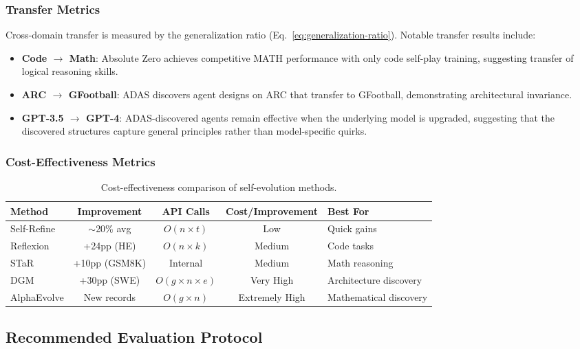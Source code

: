 \subsubsection{Transfer Metrics}

Cross-domain transfer is measured by the generalization ratio (Eq.~\ref{eq:generalization-ratio}). Notable transfer results include:

\begin{itemize}
\item \textbf{Code $\to$ Math}: Absolute Zero achieves competitive MATH performance with only code self-play training, suggesting transfer of logical reasoning skills.
\item \textbf{ARC $\to$ GFootball}: ADAS discovers agent designs on ARC that transfer to GFootball, demonstrating architectural invariance.
\item \textbf{GPT-3.5 $\to$ GPT-4}: ADAS-discovered agents remain effective when the underlying model is upgraded, suggesting that the discovered structures capture general principles rather than model-specific quirks.
\end{itemize}

\subsubsection{Cost-Effectiveness Metrics}

\begin{table}[htbp]
\centering
\caption{Cost-effectiveness comparison of self-evolution methods.}
\label{tab:cost-effectiveness}
\begin{tabular}{lcccl}
\toprule
\textbf{Method} & \textbf{Improvement} & \textbf{API Calls} & \textbf{Cost/Improvement} & \textbf{Best For} \\
\midrule
Self-Refine & $\sim$20\% avg & $O(n \times t)$ & Low & Quick gains \\
Reflexion & +24pp (HE) & $O(n \times k)$ & Medium & Code tasks \\
STaR & +10pp (GSM8K) & Internal & Medium & Math reasoning \\
DGM & +30pp (SWE) & $O(g \times n \times e)$ & Very High & Architecture discovery \\
AlphaEvolve & New records & $O(g \times n)$ & Extremely High & Mathematical discovery \\
\bottomrule
\end{tabular}
\end{table}

\subsection{Recommended Evaluation Protocol}\label{sec:ch5-protocol}

